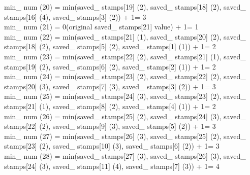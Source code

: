 \documentclass[11pt]{article}
\begin{document}
min\_ num (20) = min(saved\_ stamps[19] (2), saved\_ stamps[18] (2), saved\_ stamps[16] (4), saved\_ stamps[3] (2)) + 1= 3\\
min\_ num (21) = 0(original saved\_ stamps[21] value) + 1= 1\\
min\_ num (22) = min(saved\_ stamps[21] (1), saved\_ stamps[20] (2), saved\_ stamps[18] (2), saved\_ stamps[5] (2), saved\_ stamps[1] (1)) + 1= 2\\
min\_ num (23) = min(saved\_ stamps[22] (2), saved\_ stamps[21] (1), saved\_ stamps[19] (2), saved\_ stamps[6] (2), saved\_ stamps[2] (1)) + 1= 2\\
min\_ num (24) = min(saved\_ stamps[23] (2), saved\_ stamps[22] (2), saved\_ stamps[20] (3), saved\_ stamps[7] (3), saved\_ stamps[3] (2)) + 1= 3\\
min\_ num (25) = min(saved\_ stamps[24] (3), saved\_ stamps[23] (2), saved\_ stamps[21] (1), saved\_ stamps[8] (2), saved\_ stamps[4] (1)) + 1= 2\\
min\_ num (26) = min(saved\_ stamps[25] (2), saved\_ stamps[24] (3), saved\_ stamps[22] (2), saved\_ stamps[9] (3), saved\_ stamps[5] (2)) + 1= 3\\
min\_ num (27) = min(saved\_ stamps[26] (3), saved\_ stamps[25] (2), saved\_ stamps[23] (2), saved\_ stamps[10] (3), saved\_ stamps[6] (2)) + 1= 3\\
min\_ num (28) = min(saved\_ stamps[27] (3), saved\_ stamps[26] (3), saved\_ stamps[24] (3), saved\_ stamps[11] (4), saved\_ stamps[7] (3)) + 1= 4\\
\end{document}
